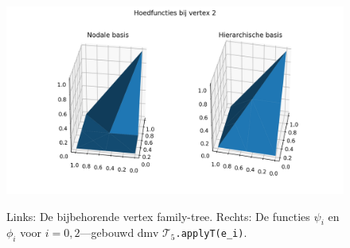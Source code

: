 \documentclass[11pt,a4paper]{amsart}
\theoremstyle{definition}
\newcommand{\T}{{\mathcal T}}
\begin{document}
\begin{figure}
\begin{minipage}{0.55\linewidth}
    \vspace{-1em}
    \includegraphics[width=\linewidth]{img/h2.png}\\
    \vspace{-2em}
  \end{minipage}
  \caption{Links: De bijbehorende vertex family-tree. Rechts: De functies $\psi_i$ en $\phi_i$ voor $i=0,2$---gebouwd dmv $\T_5$\texttt{.applyT(e\_i)}.}
\end{figure}
\end{document}
